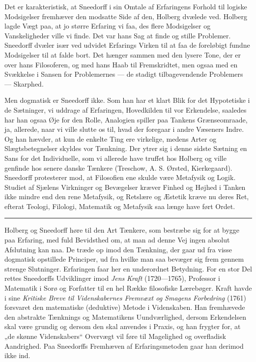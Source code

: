 \documentclass[12pt,a4paper,openany]{book}
\newcommand{\opage}[1]{\marginnote{\footnotesize\textit{[#1]}}}
\begin{document}
Det er karakteristisk, at Sneedorff i sin Omtale af Erfaringens Forhold til
logiske Modsigelser fremhæver den modsatte Side af den, Holberg dvælede ved.
Holberg lagde Vægt paa, at jo større Erfaring vi faa, des flere Modsigelser og
Vanskeligheder ville vi finde. Det var hans Sag at finde og stille Problemer.
Sneedorff dvæler især ved udvidet Erfarings Virken til at faa de foreløbigt
fundne Modsigelser til at falde bort. Det hænger sammen med den lysere Tone,
der er over hans Filosoferen, og med hans Haab til Fremskridtet, men ogsaa med
en Svækkelse i Sansen for Problemernes --- de stadigt tilbagevendende
Problemers --- Skarphed.

Men dogmatisk er Sneedorff ikke. Som han har et klart Blik for det Hypotetiske
i de Sætninger, vi uddrage af Erfaringen, Hovedkilden til vor Erkendelse,
saaledes har han ogsaa Øje for den Rolle, Analogien spiller paa Tankens
Grænseomraade, ja, allerede, naar vi ville slutte os til, hvad der foregaar i
andre Væseners Indre. Og han hævder, at kun de enkelte Ting ere virkelige,
medens Arter og Slægtsbetegnelser skyldes vor Tænkning. Der ytrer sig i denne sidste
\setcounter{footnote}{0}%
\opage{19}Sætning en Sans for det Individuelle, som vi allerede have truffet
hos Holberg og ville genfinde hos senere danske Tænkere (Treschow, A. S.
Ørsted, Kierkegaard). Sneedorff protesterer mod, at Filosofien ene skulde være
Metafysik og Logik. Studiet af Sjælens Virkninger og Bevægelser kræver Finhed
og Højhed i Tanken ikke mindre end den rene Metafysik, og Retslære og Æstetik
kræve nu deres Ret, efterat Teologi, Filologi, Matematik og Metafysik saa længe
have ført Ordet.

\begin{center}\rule{2cm}{0.4pt}\end{center}

Holberg og Sneedorff høre til den Art Tænkere, som bestræbe sig for at bygge
paa Erfaring, med fuld Bevidsthed om, at man ad denne Vej ingen absolut
Afslutning kan naa. De træde op imod den Tænkning, der gaar ud fra visse
dogmatisk opstillede Principer, ud fra hvilke man saa bevæger sig frem gennem
strenge Slutninger. Erfaringen faar her en underordnet Betydning. For en stor
Del rettes Sneedorffs Udviklinger imod \emph{Jens} \emph{Kraft} (1720---1765),
Professor i Matematik i Sorø og Forfatter til en hel Række filosofiske
Lærebøger. Kraft havde i sine \textit{Kritiske Breve til Videnskabernes
Fremvæxt og Smagens Forbedring} (1761) forsvaret den matematiske (deduktive)
Metode i Videnskaben. Han fremhævede den abstrakte Tænknings og Matematikens
Uundværlighed, dersom Erkendelsen skal være grundig og dersom den skal anvendes
i Praxis, og han frygter for, at „de skønne Videnskabers“ Overvægt vil føre til
Magelighed og overfladisk Aandrighed. Paa Sneedorffs Fremhæven af
Erfaringsmetoden gaar han derimod ikke ind.
\end{document}
